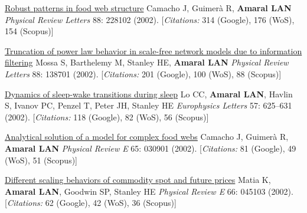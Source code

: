 \NumberedItem{\makebox[0.8cm][r]{[45]}}
\href{/people/amaral/robust-patterns-in-food-web-structure}
{Robust patterns in food web structure}
\newline
Camacho J, Guimer\`a R, {\textbf{Amaral LAN}}
\newline
\textit{Physical Review Letters}
    88:
228102 (2002).
    [{\em{Citations:}} 314 (Google), 176 (WoS), 154 (Scopus)]
\newline
\Gap
~
\Gap

\NumberedItem{\makebox[0.8cm][r]{[44]}}
\href{/people/amaral/truncation-of-power-law-behavior-in-scale-free-network-models-due-to-information-filtering}
{Truncation of power law behavior in scale-free network models due to information filtering}
\newline
Mossa S, Barthelemy M, Stanley HE, {\textbf{Amaral LAN}}
\newline
\textit{Physical Review Letters}
    88:
138701 (2002).
    [{\em{Citations:}} 201 (Google), 100 (WoS), 88 (Scopus)]
\newline
\Gap
~
\Gap

\NumberedItem{\makebox[0.8cm][r]{[43]}}
\href{/people/amaral/dynamics-of-sleep-wake-transitions-during-sleep}
{Dynamics of sleep-wake transitions during sleep}
\newline
Lo CC, {\textbf{Amaral LAN}}, Havlin S, Ivanov PC, Penzel T, Peter JH, Stanley HE
\newline
\textit{Europhysics Letters}
    57:
625--631 (2002).
    [{\em{Citations:}} 118 (Google), 82 (WoS), 56 (Scopus)]
\newline
\Gap
~
\Gap

\NumberedItem{\makebox[0.8cm][r]{[42]}}
\href{/people/amaral/analytical-solution-of-a-model-for-complex-food-webs}
{Analytical solution of a model for complex food webs}
\newline
Camacho J, Guimer\`a R, {\textbf{Amaral LAN}}
\newline
\textit{Physical Review E}
    65:
030901 (2002).
    [{\em{Citations:}} 81 (Google), 49 (WoS), 51 (Scopus)]
\newline
\Gap
~
\Gap

\NumberedItem{\makebox[0.8cm][r]{[41]}}
\href{/people/amaral/different-scaling-behaviors-of-commodity-spot-and-future-prices}
{Different scaling behaviors of commodity spot and future prices}
\newline
Matia K, {\textbf{Amaral LAN}}, Goodwin SP, Stanley HE
\newline
\textit{Physical Review E}
    66:
045103 (2002).
    [{\em{Citations:}} 62 (Google), 42 (WoS), 36 (Scopus)]
\newline
\Gap
~
\Gap

